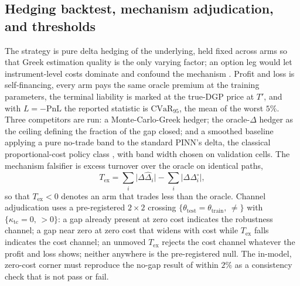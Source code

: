 \documentclass[10pt]{article}
\begin{document}
\subsection{Hedging backtest, mechanism adjudication, and thresholds}
\label{sec:hedge}
The strategy is pure delta hedging of the underlying, held fixed across arms so that
Greek estimation quality is the only varying factor; an option leg would let
instrument-level costs dominate and confound the mechanism
\citep{armstrong2024deep}. Profit and loss is self-financing, every arm pays the same
oracle premium at the training parameters, the terminal liability is marked at the
true-DGP price at $T'$, and with $L=-\mathrm{PnL}$ the reported statistic is
$\mathrm{CVaR}_{95}$, the mean of the worst $5\%$. Three competitors are run: a
Monte-Carlo-Greek hedger; the oracle-$\Delta$ hedger as the ceiling defining the
fraction of the gap closed; and a smoothed baseline applying a pure no-trade band to
the standard PINN's delta, the classical proportional-cost policy class
\citep{whalley1997asymptotic}, with band width chosen on validation cells. The
mechanism falsifier is excess turnover over the oracle on identical paths,
\begin{equation}\label{eq:tex}
T_{\mathrm{ex}}
=\sum_i\bigl|\Delta\hat{\Delta}_i\bigr|
-\sum_i\bigl|\Delta\Delta^{\circ}_i\bigr|,
\end{equation}
so that $T_{\mathrm{ex}}<0$ denotes an arm that trades less than the oracle.
Channel adjudication uses a pre-registered $2\times2$ crossing
$\{\theta_{\mathrm{test}}=\theta_{\mathrm{train}},\,\neq\}$ with
$\{\kappa_{\mathrm{tc}}=0,\,>0\}$: a gap already present at zero cost indicates the
robustness channel; a gap near zero at zero cost that widens with cost while
$T_{\mathrm{ex}}$ falls indicates the cost channel; an unmoved $T_{\mathrm{ex}}$
rejects the cost channel whatever the profit and loss shows; neither anywhere is the
pre-registered null. The in-model, zero-cost corner must reproduce the no-gap result
of \citet{sakuma2026a} within $2\%$ as a consistency check that is not pass or fail.
\end{document}

